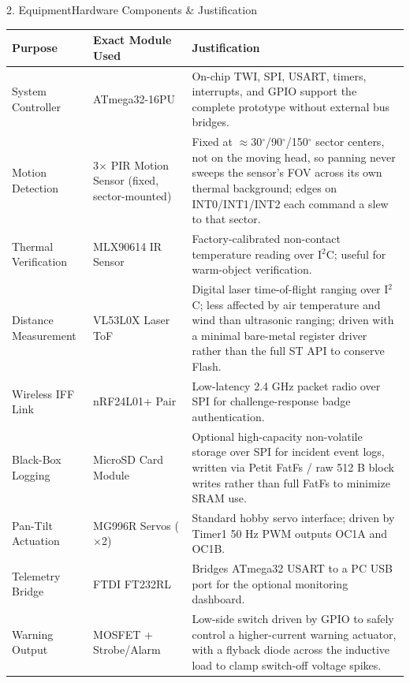 \documentclass[aspectratio=169, 10pt]{beamer}
\begin{document}
\begin{frame}{2. Equipment}{Hardware Components \& Justification}
    \tiny
    \renewcommand{\arraystretch}{0.93}
    \begin{table}
        \centering
        \begin{tabular}{p{2.15cm} p{2.85cm} p{5.6cm}}
            \toprule
            \textbf{\color{Accent} Purpose} & \textbf{\color{Accent} Exact Module Used} & \textbf{\color{Accent} Justification} \\
            \midrule
            System Controller & ATmega32-16PU & On-chip TWI, SPI, USART, timers, interrupts, and GPIO support the complete prototype without external bus bridges. \\
            Motion Detection & 3$\times$ PIR Motion Sensor (fixed, sector-mounted) & Fixed at $\approx$30$^\circ$/90$^\circ$/150$^\circ$ sector centers, not on the moving head, so panning never sweeps the sensor's FOV across its own thermal background; edges on INT0/INT1/INT2 each command a slew to that sector. \\
            Thermal Verification & MLX90614 IR Sensor & Factory-calibrated non-contact temperature reading over I$^2$C; useful for warm-object verification. \\
            Distance Measurement & VL53L0X Laser ToF & Digital laser time-of-flight ranging over I$^2$C; less affected by air temperature and wind than ultrasonic ranging; driven with a minimal bare-metal register driver rather than the full ST API to conserve Flash. \\
            Wireless IFF Link & nRF24L01+ Pair & Low-latency 2.4 GHz packet radio over SPI for challenge-response badge authentication. \\
            Black-Box Logging & MicroSD Card Module & Optional high-capacity non-volatile storage over SPI for incident event logs, written via Petit FatFs / raw 512 B block writes rather than full FatFs to minimize SRAM use. \\
            Pan-Tilt Actuation & MG996R Servos ($\times$2) & Standard hobby servo interface; driven by Timer1 50 Hz PWM outputs OC1A and OC1B. \\
            Telemetry Bridge & FTDI FT232RL & Bridges ATmega32 USART to a PC USB port for the optional monitoring dashboard. \\
            Warning Output & MOSFET + Strobe/Alarm & Low-side switch driven by GPIO to safely control a higher-current warning actuator, with a flyback diode across the inductive load to clamp switch-off voltage spikes. \\

\end{tabular}
\end{table}
\end{frame}
\end{document}
